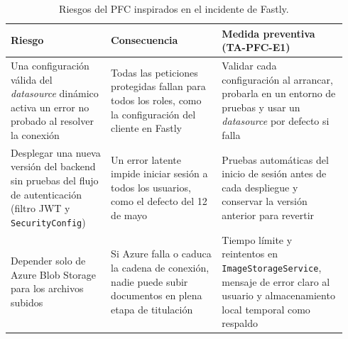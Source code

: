 \begin{table}[h]
\centering
\small
\begin{tabular}{@{}>{\raggedright\arraybackslash}p{0.28\linewidth}>{\raggedright\arraybackslash}p{0.31\linewidth}>{\raggedright\arraybackslash}p{0.35\linewidth}@{}}
\toprule
\textbf{Riesgo} & \textbf{Consecuencia} & \textbf{Medida preventiva (TA-PFC-E1)} \\
\midrule
Una configuración válida del \textit{datasource} dinámico activa un error no probado al resolver la conexión &
Todas las peticiones protegidas fallan para todos los roles, como la configuración del cliente en Fastly &
Validar cada configuración al arrancar, probarla en un entorno de pruebas y usar un \textit{datasource} por defecto si falla \\
\addlinespace
Desplegar una nueva versión del backend sin pruebas del flujo de autenticación (filtro JWT y \texttt{SecurityConfig}) &
Un error latente impide iniciar sesión a todos los usuarios, como el defecto del 12 de mayo &
Pruebas automáticas del inicio de sesión antes de cada despliegue y conservar la versión anterior para revertir \\
\addlinespace
Depender solo de Azure Blob Storage para los archivos subidos &
Si Azure falla o caduca la cadena de conexión, nadie puede subir documentos en plena etapa de titulación &
Tiempo límite y reintentos en \texttt{ImageStorageService}, mensaje de error claro al usuario y almacenamiento local temporal como respaldo \\
\bottomrule
\end{tabular}
\caption{Riesgos del PFC inspirados en el incidente de Fastly.}
\end{table}
